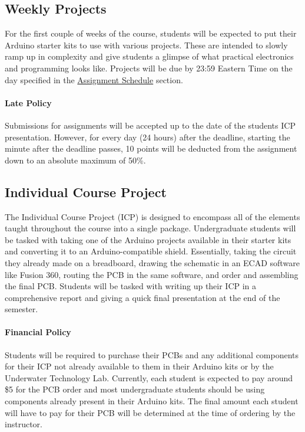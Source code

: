     \subsection*{Weekly Projects}

    For the first couple of weeks of the course, students will be expected to put their Arduino starter kits to use with various projects.
    These are intended to slowly ramp up in complexity and give students a glimpse of what practical electronics and programming looks like.
    Projects will be due by 23:59 Eastern Time on the day specified in the \hyperref[sec:assignment_sch]{Assignment Schedule} section.
    
    \paragraph*{Late Policy} Submissions for assignments will be accepted up to the date of the students ICP presentation.
    However, for every day (24 hours) after the deadline, starting the minute after the deadline passes, 10 points will be deducted from the assignment down to an absolute maximum of 50\%.


    \subsection*{Individual Course Project}

    The Individual Course Project (ICP) is designed to encompass all of the elements taught throughout the course into a single package.
    Undergraduate students will be tasked with taking one of the Arduino projects available in their starter kits and converting it to an Arduino-compatible shield.
    Essentially, taking the circuit they already made on a breadboard, drawing the schematic in an ECAD software like Fusion 360, routing the PCB in the same software, and order and assembling the final PCB. 
    Students will be tasked with writing up their ICP in a comprehensive report and giving a quick final presentation at the end of the semester.

    \paragraph*{Financial Policy} Students will be required to purchase their PCBs and any additional components for their ICP not already available to them in their Arduino kits or by the Underwater Technology Lab. 
    Currently, each student is expected to pay around \$5 for the PCB order and most undergraduate students should be using components already present in their Arduino kits. 
    The final amount each student will have to pay for their PCB will be determined at the time of ordering by the instructor.
    
